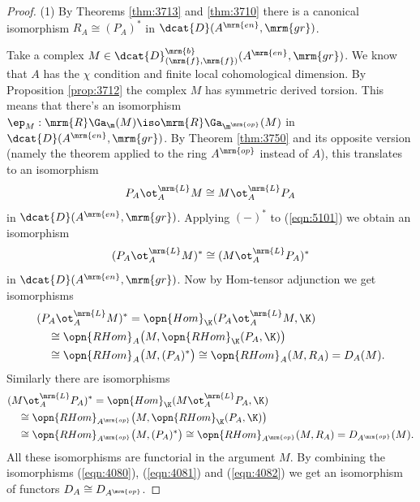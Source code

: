 \begin{proof} \mbox{}

\smallskip \noindent
(1) By Theorems \ref{thm:3713} and \ref{thm:3710} there is a canonical 
isomorphism 
$R_A \cong (P_A)^*$ in $\dcat{D}(A^{\mrm{en}}, \mrm{gr})$. 

Take a complex 
$M \in \dcat{D}^{\mrm{b}}_{(\mrm{f}, \mrm{f})}(A^{\mrm{en}}, \mrm{gr})$.
We know that $A$ has the $\chi$ condition and finite local cohomological 
dimension. By Proposition \ref{prop:3712} the complex $M$ has symmetric derived 
torsion. This means that there's an isomorphism 
$\ep_M : \mrm{R} \Ga_{\m}(M) \iso \mrm{R} \Ga_{\m^{\mrm{op}}}(M)$
in $\dcat{D}(A^{\mrm{en}}, \mrm{gr})$. 
By Theorem \ref{thm:3750}  and its opposite version (namely the theorem applied 
to the ring $A^{\mrm{op}}$ instead of $A$), this translates to an isomorphism 
\begin{equation} \label{eqn:5101}
P_A \ot^{\mrm{L}}_{A} M \cong M \ot^{\mrm{L}}_{A} P_A
\end{equation}
in $\dcat{D}(A^{\mrm{en}}, \mrm{gr})$.
Applying $(-)^*$ to  (\ref{eqn:5101}) we obtain an isomorphism 
\begin{equation} \label{eqn:4080}
(P_A \ot^{\mrm{L}}_{A} M)^* \cong (M \ot^{\mrm{L}}_{A} P_A)^*
\end{equation}
in $\dcat{D}(A^{\mrm{en}}, \mrm{gr})$.
Now by Hom-tensor adjunction we get isomorphisms
\begin{equation} \label{eqn:4081}
\begin{aligned}
& (P_A \ot^{\mrm{L}}_{A} M)^* = 
\opn{Hom}_{\K}(P_A \ot^{\mrm{L}}_{A} M , \K) 
\\
& \quad 
\cong 
\opn{RHom}_{A} \bigl( M, \opn{RHom}_{\K}(P_A, \K) \bigr) 
\\
& \quad 
\cong \opn{RHom}_{A} \bigl( M, (P_A)^* \bigr) 
\cong \opn{RHom}_{A}(M, R_A) = D_A(M) .
\end{aligned} 
\end{equation}
Similarly there are isomorphisms
\begin{equation} \label{eqn:4082}
\begin{aligned}
& (M \ot^{\mrm{L}}_{A} P_A)^* = 
\opn{Hom}_{\K}(M \ot^{\mrm{L}}_{A} P_A , \K) 
\\
& \quad 
\cong 
\opn{RHom}_{A^{\mrm{op}}} \bigl( M, \opn{RHom}_{\K}(P_A, \K) \bigr) 
\\
& \quad 
\cong \opn{RHom}_{A^{\mrm{op}}} \bigl( M, (P_A)^* \bigr) 
\cong \opn{RHom}_{A^{\mrm{op}}}(M, R_A) = D_{A^{\mrm{op}}}(M) .
\end{aligned}
\end{equation}
All these isomorphisms are functorial in the argument $M$.
By combining the isomorphisms (\ref{eqn:4080}), (\ref{eqn:4081}) and 
(\ref{eqn:4082}) we get an isomorphism of functors 
$D_A \cong D_{A^{\mrm{op}}}$. 


\end{proof}
